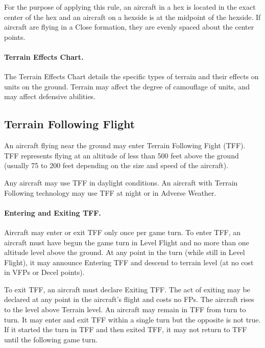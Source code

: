 For the purpose of applying this rule, an aircraft in a hex is located in the exact center of the hex and an aircraft on a hexside is at the midpoint of the hexside. If aircraft are flying in a Close formation, they are evenly spaced about the center points.

\paragraph{Terrain Effects Chart.} The Terrain Effects Chart details the specific types of terrain and their effects on units on the ground. Terrain may affect the degree of camouflage of units, and may affect defensive abilities.

\subsection{Terrain Following Flight}

An aircraft flying near the ground may enter Terrain Following Fight (TFF). TFF represents flying at an altitude of less than 500 feet above the ground (usually 75 to 200 feet depending on the size and speed of the aircraft).

Any aircraft may use TFF in daylight conditions. An aircraft with Terrain Following technology may use TFF at night or in Adverse Weather.

\paragraph{Entering and Exiting TFF.} Aircraft may enter or exit TFF only once per game turn. To enter TFF, an aircraft must have begun the game turn in Level Flight and no more than one altitude level above the ground. At any point in the turn (while still in Level Flight), it may announce Entering TFF and descend to terrain level (at no cost in VFPs or Decel points).

To exit TFF, an aircraft must declare Exiting TFF. The act of exiting may be declared at any point in the aircraft's flight and costs no FPs. The aircraft rises to the level above Terrain level. An aircraft may remain in TFF from turn to turn. It may enter and exit TFF within a single turn but the opposite is not true.  If it started the turn in TFF and then exited TFF, it may not return to TFF until the following game turn. 


